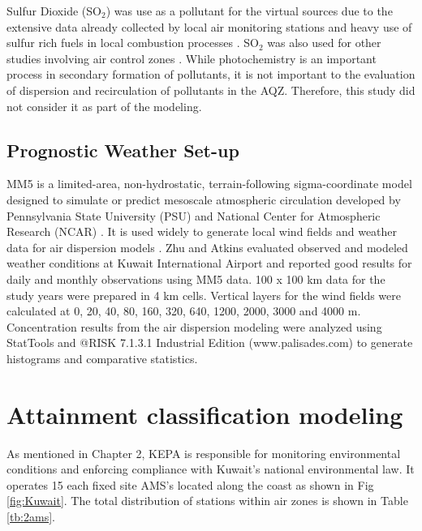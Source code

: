 Sulfur Dioxide (SO$_{2}$) was use as a pollutant for the virtual sources due to the extensive data already collected by local air monitoring stations and heavy use of sulfur rich fuels in local combustion processes \citep{Al-Awadhi2014, Al-Rashidi2005}.  SO$_{2}$ was also used for other studies involving air control zones \citep{Hao2000, Henschel2013, Pereira2007}.  While photochemistry is an important process in secondary formation of pollutants, it is not important to the evaluation of dispersion and recirculation of pollutants in the AQZ.  Therefore, this study did not consider it as part of the modeling. 

\subsection{Prognostic Weather Set-up}

MM5 is a limited-area, non-hydrostatic, terrain-following sigma-coordinate model designed to simulate or predict mesoscale atmospheric circulation developed by Pennsylvania State University (PSU) and National Center for Atmospheric Research (NCAR) \citep{Grell1994}.  It is used widely to generate local wind fields and weather data for air dispersion models \citep{Ghannam2013a, Lee2009, Tsai2011, Zhu2004}.  Zhu and Atkins evaluated observed and modeled weather conditions at Kuwait International Airport and reported good results for daily and monthly observations using MM5 data.  100 x 100 km data for the study years were prepared in 4 km cells. Vertical layers for the wind fields were calculated at 0, 20, 40, 80, 160, 320, 640, 1200, 2000, 3000 and 4000 m. Concentration results from the air dispersion modeling were analyzed using StatTools and @RISK 7.1.3.1 Industrial Edition (www.palisades.com) to generate histograms and comparative statistics. 
\clearpage
\section{Attainment classification modeling}

As mentioned in Chapter 2, KEPA is responsible for monitoring environmental conditions and enforcing compliance with Kuwait's national environmental law. It operates 15 each fixed site AMS’s located along the coast as shown in Fig \ref{fig:Kuwait}.  The total distribution of stations within air zones is shown in Table \ref{tb:2ams}. 

